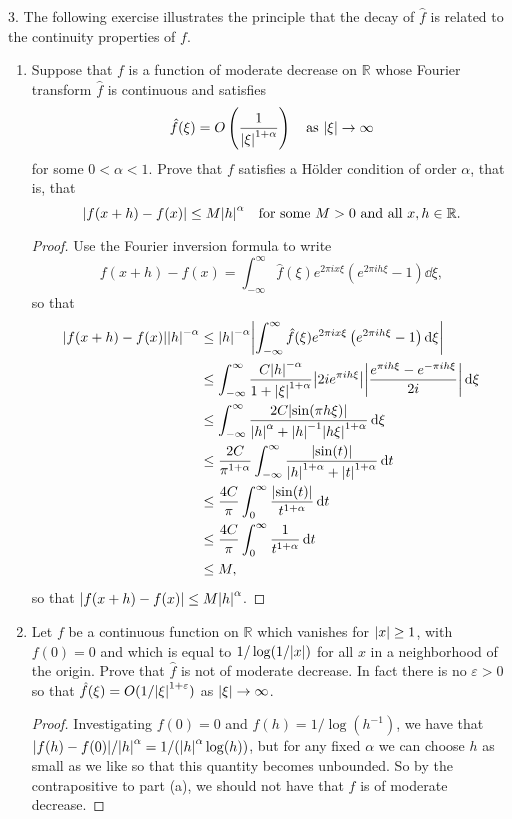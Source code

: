 \documentclass[11pt]{article}
\newcommand{\br}[1]{\left(#1\right)}
\begin{document}
3. The following exercise illustrates the principle that the decay of $\hat{f}$ is related to the continuity properties of $f$.
\begin{enumerate}[label=(\alph*)]
  \item Suppose that $f$ is a function of moderate decrease on $\mathbb{R}$ whose Fourier transform $\hat{f}$ is continuous and satisfies \[\hat{f}(\xi) = O\br{\frac{1}{\abs{\xi}^{1+\alpha}}} \quad \text{as }\abs{\xi}\to \infty\] for some $0< \alpha < 1$. Prove that $f$ satisfies a H\"older condition of order $\alpha$, that is, that \[\abs{f(x+h) - f(x)}\leq M\abs{h}^{\alpha} \quad \text{for some $M > 0$ and all $x,h\in \mathbb{R}$.}\]
  \begin{proof}
    Use the Fourier inversion formula to write \[f(x+h) - f(x) = \int_{-\infty}^{\infty} \hat{f}(\xi) e^{2\pi i x \xi}\left(e^{2\pi i h \xi} - 1\right)\dd{\xi},\] so that
    \begin{align*}
      \abs{f(x+h) - f(x)}\abs{h}^{-\alpha} &\leq \abs{h}^{-\alpha}\abs{\int_{-\infty}^{\infty} \hat{f}(\xi) e^{2\pi i x \xi}\left(e^{2\pi i h \xi} - 1\right)\dd{\xi}}\\
      &\leq \int_{-\infty}^{\infty} \frac{C\abs{h}^{-\alpha}}{1 + \abs{\xi}^{1+\alpha}}\abs{2 i e^{\pi i h \xi}}\abs{\frac{e^{\pi i h \xi} - e^{-\pi i h \xi}}{2i}}\dd{\xi}\\
      &\leq \int_{-\infty}^{\infty} \frac{2C\abs{\sin(\pi h \xi)}}{\abs{h}^{\alpha} + \abs{h}^{-1} \abs{h\xi}^{1+\alpha}}\dd{\xi}\\
      &\leq \frac{2C}{\pi^{1+\alpha}}\int_{-\infty}^{\infty}\frac{\abs{\sin(t)}}{\abs{h}^{1+\alpha} + \abs{t}^{1+\alpha}}\dd{t}\\
      &\leq \frac{4C}{\pi}\int_{0}^{\infty} \frac{\abs{\sin(t)}}{t^{1+\alpha}}\dd{t}\\
      &\leq \frac{4C}{\pi}\int_{0}^{\infty} \frac{1}{t^{1+\alpha}}\dd{t}\\
      &\leq M,
    \end{align*} so that $\abs{f(x+h) - f(x)}\leq M\abs{h}^{\alpha}$.
  \end{proof}
  \item Let $f$ be a continuous function on $\mathbb{R}$ which vanishes for $\abs{x}\geq 1$, with $f(0) = 0$ and which is equal to $1/\log(1/\abs{x})$ for all $x$ in a neighborhood of the origin. Prove that $\hat{f}$ is not of moderate decrease. In fact there is no $\varepsilon >0$ so that $\hat{f}(\xi) = O(1/\abs{\xi}^{1+\varepsilon})$ as $\abs{\xi}\to \infty$.
  \begin{proof}
    Investigating $f(0) = 0$ and $f(h) = 1/\log(h^{-1})$, we have that $\abs{f(h) - f(0)}/\abs{h}^\alpha = 1/(\abs{h}^\alpha\log(h))$, but for any fixed $\alpha$ we can choose $h$ as small as we like so that this quantity becomes unbounded. So by the contrapositive to part (a), we should not have that $f$ is of moderate decrease.
  \end{proof}
\end{enumerate}
\end{document}
